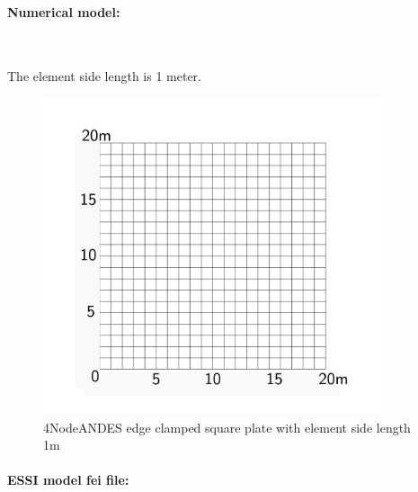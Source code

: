 \documentclass[fleqn,11pt]{article}
\begin{document}
\clearpage
\paragraph{Numerical model:} ~

The element side length is 1 meter. 


\begin{figure}[!htb]
  \centering
  \includegraphics[width=10cm]{../Figure-files/_Chapter_Appendix_Illustrative_Examples/square_plate4_2.pdf}
  \caption{4NodeANDES edge clamped square plate with element side length 1m }
  \label{fig 4NodeANDES edges clamped square plate with element side length 1m }
\end{figure}


\paragraph{ESSI model fei file: } ~
\end{document}
